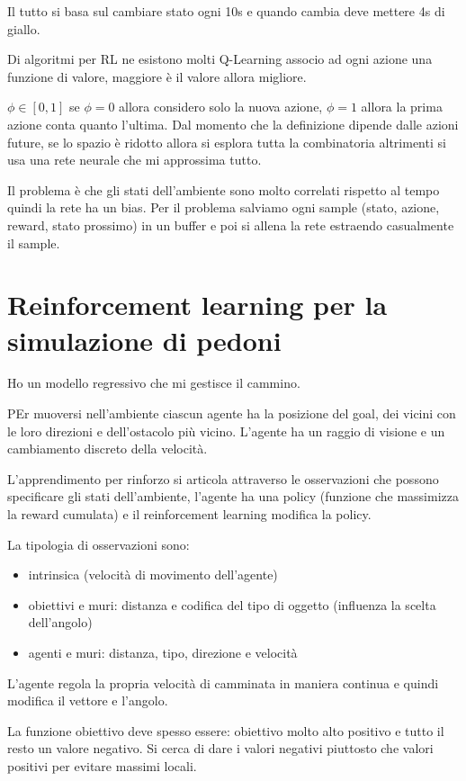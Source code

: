 Il tutto si basa sul cambiare stato ogni 10s e quando cambia deve mettere 4s di 
giallo.

Di algoritmi per RL ne esistono molti Q-Learning associo ad ogni azione 
una funzione di valore, maggiore è il valore allora migliore.

$\phi \in [0,1]$ se $\phi=0$ allora considero solo la nuova azione, $\phi=1$ 
allora la prima azione conta quanto l'ultima. Dal momento che la definizione dipende 
dalle azioni future, se lo spazio è ridotto allora si esplora tutta la combinatoria 
altrimenti si usa una rete neurale che mi approssima tutto.

Il problema è che gli stati dell'ambiente sono molto correlati rispetto al tempo 
quindi la rete ha un bias. Per il problema salviamo ogni sample (stato, azione, 
reward, stato prossimo) in un buffer e poi si allena la rete estraendo casualmente 
il sample.

\section{Reinforcement learning per la simulazione di pedoni}
Ho un modello regressivo che mi gestisce il cammino. 

PEr muoversi nell'ambiente ciascun agente ha la posizione del goal, dei vicini con 
le loro direzioni e dell'ostacolo più vicino. L'agente ha un raggio di visione e un 
cambiamento discreto della velocità.

L'apprendimento per rinforzo si articola attraverso le osservazioni che possono 
specificare gli stati dell'ambiente, l'agente ha una policy (funzione che massimizza 
la reward cumulata) e il reinforcement learning modifica la policy.

La tipologia di osservazioni sono:
\begin{itemize}
      \item intrinsica (velocità di movimento dell'agente)
      \item obiettivi e muri: distanza e codifica del tipo di oggetto (influenza la scelta dell'angolo)
      \item agenti e muri: distanza, tipo, direzione e velocità
\end{itemize}

L'agente regola la propria velocità di camminata in maniera continua e quindi
modifica il vettore e l'angolo.

La funzione obiettivo deve spesso essere: obiettivo molto alto positivo e tutto 
il resto un valore negativo. Si cerca di dare i valori negativi piuttosto che 
valori positivi per evitare massimi locali.

